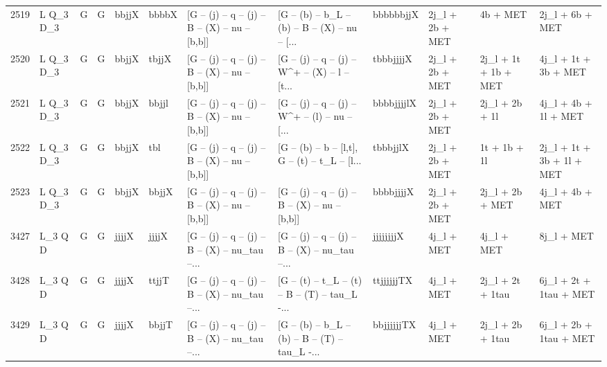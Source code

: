 \begin{tabular}{llllllllllll}
2519 &    L Q\_3 D\_3 &     G &     G &       bbjjX &       bbbbX &  [G -- (j) -- q -- (j) -- B -- (X) -- nu -- [b,b]] &  [G -- (b) -- b\_L -- (b) -- B -- (X) -- nu -- [... &   bbbbbbjjX &          2j\_l + 2b + MET &                 4b + MET &                    2j\_l + 6b + MET \\
2520 &    L Q\_3 D\_3 &     G &     G &       bbjjX &       tbjjX &  [G -- (j) -- q -- (j) -- B -- (X) -- nu -- [b,b]] &  [G -- (j) -- q -- (j) -- W\textasciicircum + -- (X) -- l -- [t... &   tbbbjjjjX &          2j\_l + 2b + MET &     2j\_l + 1t + 1b + MET &               4j\_l + 1t + 3b + MET \\
2521 &    L Q\_3 D\_3 &     G &     G &       bbjjX &       bbjjl &  [G -- (j) -- q -- (j) -- B -- (X) -- nu -- [b,b]] &  [G -- (j) -- q -- (j) -- W\textasciicircum + -- (l) -- nu -- [... &  bbbbjjjjlX &          2j\_l + 2b + MET &           2j\_l + 2b + 1l &               4j\_l + 4b + 1l + MET \\
2522 &    L Q\_3 D\_3 &     G &     G &       bbjjX &         tbl &  [G -- (j) -- q -- (j) -- B -- (X) -- nu -- [b,b]] &  [G -- (b) -- b -- [l,t], G -- (t) -- t\_L -- [l... &    tbbbjjlX &          2j\_l + 2b + MET &             1t + 1b + 1l &          2j\_l + 1t + 3b + 1l + MET \\
2523 &    L Q\_3 D\_3 &     G &     G &       bbjjX &       bbjjX &  [G -- (j) -- q -- (j) -- B -- (X) -- nu -- [b,b]] &  [G -- (j) -- q -- (j) -- B -- (X) -- nu -- [b,b]] &   bbbbjjjjX &          2j\_l + 2b + MET &          2j\_l + 2b + MET &                    4j\_l + 4b + MET \\
3427 &      L\_3 Q D &     G &     G &       jjjjX &       jjjjX &  [G -- (j) -- q -- (j) -- B -- (X) -- nu\_tau --... &  [G -- (j) -- q -- (j) -- B -- (X) -- nu\_tau --... &   jjjjjjjjX &               4j\_l + MET &               4j\_l + MET &                         8j\_l + MET \\
3428 &      L\_3 Q D &     G &     G &       jjjjX &       ttjjT &  [G -- (j) -- q -- (j) -- B -- (X) -- nu\_tau --... &  [G -- (t) -- t\_L -- (t) -- B -- (T) -- tau\_L -... &  ttjjjjjjTX &               4j\_l + MET &         2j\_l + 2t + 1tau &             6j\_l + 2t + 1tau + MET \\
3429 &      L\_3 Q D &     G &     G &       jjjjX &       bbjjT &  [G -- (j) -- q -- (j) -- B -- (X) -- nu\_tau --... &  [G -- (b) -- b\_L -- (b) -- B -- (T) -- tau\_L -... &  bbjjjjjjTX &               4j\_l + MET &         2j\_l + 2b + 1tau &             6j\_l + 2b + 1tau + MET \\

\end{tabular}
